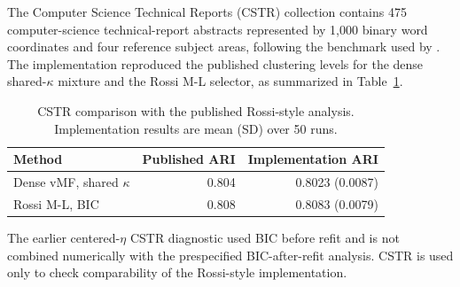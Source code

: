 \documentclass[preprint,12pt,authoryear]{elsarticle}
\begin{document}
The Computer Science Technical Reports (CSTR) collection contains 475
computer-science technical-report abstracts represented by
1,000 binary word coordinates and four reference subject areas, following the
benchmark used by \citet{rossi2022sparsevmf}. The implementation reproduced
the published clustering levels for the dense shared-$\kappa$ mixture and the
Rossi M-L selector, as summarized in Table~\ref{tab:s-cstr-bridge}.

\begin{table}[H]
\centering
\small
\caption{CSTR comparison with the published Rossi-style analysis.
Implementation results are mean (SD) over 50 runs.}
\label{tab:s-cstr-bridge}
\begin{tabular}{lrr}
\toprule
Method & Published ARI & Implementation ARI \\
\midrule
Dense vMF, shared $\kappa$ & 0.804 & 0.8023 (0.0087) \\
Rossi M-L, BIC & 0.808 & 0.8083 (0.0079) \\
\bottomrule
\end{tabular}
\end{table}

The earlier centered-$\eta$ CSTR diagnostic used BIC before refit and is not
combined numerically with the prespecified BIC-after-refit analysis. CSTR is used only to
check comparability of the Rossi-style implementation.



\end{document}
